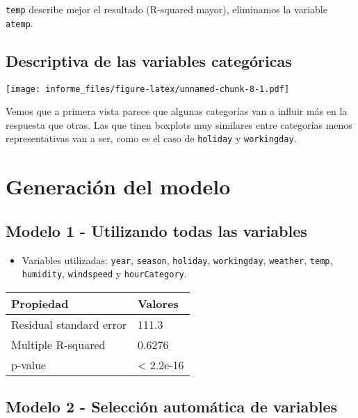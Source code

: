 \documentclass[
]{article}
\providecommand{\tightlist}{%
  \setlength{\itemsep}{0pt}\setlength{\parskip}{0pt}}
\begin{document}
\texttt{temp} describe mejor el resultado (R-squared mayor), eliminamos
la variable \texttt{atemp}.

\hypertarget{descriptiva-de-las-variables-categuxf3ricas}{%
\subsection{Descriptiva de las variables
categóricas}\label{descriptiva-de-las-variables-categuxf3ricas}}

\texttt{[image: informe\_files/figure-latex/unnamed-chunk-8-1.pdf]}

Vemos que a primera vista parece que algunas categorías van a influir
más en la respuesta que otras. Las que tinen boxplots muy similares
entre categorías menos representativas van a ser, como es el caso de
\texttt{holiday} y \texttt{workingday}.

\hypertarget{generaciuxf3n-del-modelo}{%
\section{Generación del modelo}\label{generaciuxf3n-del-modelo}}

\hypertarget{modelo-1---utilizando-todas-las-variables}{%
\subsection{Modelo 1 - Utilizando todas las
variables}\label{modelo-1---utilizando-todas-las-variables}}

\begin{itemize}
\tightlist
\item
  Variables utilizadas: \texttt{year}, \texttt{season},
  \texttt{holiday}, \texttt{workingday}, \texttt{weather},
  \texttt{temp}, \texttt{humidity}, \texttt{windspeed} y
  \texttt{hourCategory}.
\end{itemize}

\begin{longtable}[]{@{}ll@{}}
\toprule
Propiedad & Valores\tabularnewline
\midrule
\endhead
Residual standard error & 111.3\tabularnewline
Multiple R-squared & 0.6276\tabularnewline
p-value & \textless{} 2.2e-16\tabularnewline
\bottomrule
\end{longtable}

\hypertarget{modelo-2---selecciuxf3n-automuxe1tica-de-variables}{%
\subsection{Modelo 2 - Selección automática de
variables}\label{modelo-2---selecciuxf3n-automuxe1tica-de-variables}}
\end{document}
